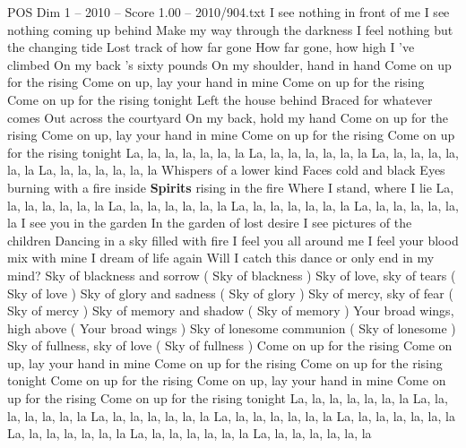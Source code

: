 \begin{textsample}{POS Dim 1 – 2010 – Score 1.00 – 2010/904.txt}  \label{ex:f1_pos_029}
I see nothing in front of me I see nothing coming up behind Make my way through the darkness I feel nothing but the changing tide Lost track of how far gone How far gone, how high I 've climbed On my back 's sixty pounds On my shoulder, hand in hand Come on up for the rising Come on up, lay your hand in mine Come on up for the rising Come on up for the rising tonight Left the house behind Braced for whatever comes Out across the courtyard On my back, hold my hand Come on up for the rising Come on up, lay your hand in mine Come on up for the rising Come on up for the rising tonight La, la, la, la, la, la, la La, la, la, la, la, la, la La, la, la, la, la, la, la La, la, la, la, la, la, la Whispers of a lower kind Faces cold and black Eyes burning with a fire inside \textbf{Spirits} rising in the fire Where I stand, where I lie La, la, la, la, la, la, la La, la, la, la, la, la, la La, la, la, la, la, la, la La, la, la, la, la, la, la I see you in the garden In the garden of lost desire I see pictures of the children Dancing in a sky filled with fire I feel you all around me I feel your blood mix with mine I dream of life again Will I catch this dance or only end in my mind?
Sky of blackness and sorrow ( Sky of blackness ) Sky of love, sky of tears ( Sky of love ) Sky of glory and sadness ( Sky of glory ) Sky of mercy, sky of fear ( Sky of mercy ) Sky of memory and shadow ( Sky of memory ) Your broad wings, high above ( Your broad wings ) Sky of lonesome communion ( Sky of lonesome ) Sky of fullness, sky of love ( Sky of fullness ) Come on up for the rising Come on up, lay your hand in mine Come on up for the rising Come on up for the rising tonight Come on up for the rising Come on up, lay your hand in mine Come on up for the rising Come on up for the rising tonight La, la, la, la, la, la, la La, la, la, la, la, la, la La, la, la, la, la, la, la La, la, la, la, la, la, la La, la, la, la, la, la, la La, la, la, la, la, la, la La, la, la, la, la, la, la La, la, la, la, la, la, la

\end{textsample}
